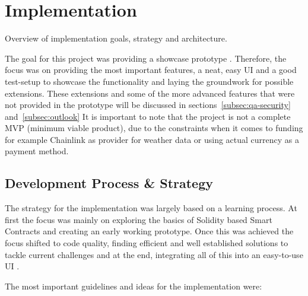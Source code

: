 \documentclass[11pt,a4paper]{article}
\begin{document}
	
	\section{Implementation}\label{sec:implementation}
	Overview of implementation goals, strategy and architecture.

	The goal for this project was providing a showcase prototype .
	Therefore, the focus was on providing the most important features, a neat, easy UI and a good test-setup to showcase the functionality and laying the groundwork for possible extensions.
	These extensions and some of the more advanced features that were not provided in the prototype will be discussed in sections~\ref{subsec:qa-security} and~\ref{subsec:outlook}
	It is important to note that the project is not a complete MVP (minimum viable product), due to the constraints when it comes to funding for example Chainlink as provider for weather data or using actual currency as a payment method.


	\subsection{Development Process \& Strategy}\label{subsec:dev-strategy}
	The strategy for the implementation was largely based on a learning process.
	At first the focus was mainly on exploring the basics of Solidity based Smart Contracts and creating an early working prototype.
	Once this was achieved the focus shifted to code quality, finding efficient and well established solutions to tackle current challenges and at the end, integrating all of this into an easy-to-use UI .


	The most important guidelines and ideas for the implementation were:
\end{document}
